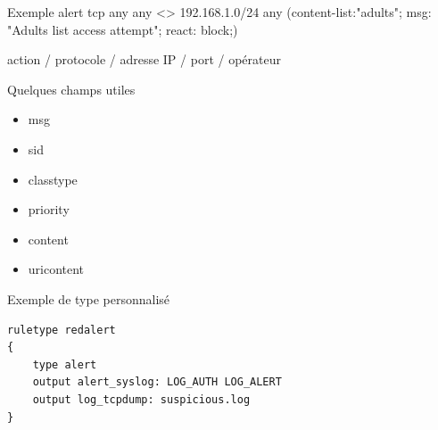 \documentclass{beamer}
\begin{document}
{\begin{exampleblock}{Exemple}
\color{red}alert \color{black!30!green}tcp \color{blue} any \color{blue!60!red}any \color{orange}<> \color{blue}192.168.1.0/24 \color{blue!60!red}any \color{black}(content-list:"adults"; msg: "Adults list access attempt"; react: block;)

\color{red}action	\color{black}/ \color{black!30!green}protocole \color{black}/ \color{blue}adresse IP \color{black}/ \color{blue!60!red}port \color{black}/ \color{orange}opérateur
\end{exampleblock}

\framebreak

\begin{block}{Quelques champs utiles}
\begin{itemize}
\item msg
\item sid
\item classtype
\item priority
\item content
\item uricontent
\end{itemize}
\end{block}

\framebreak

\begin{exampleblock}{Exemple de type personnalisé}
\begin{verbatim}
ruletype redalert
{
    type alert 
    output alert_syslog: LOG_AUTH LOG_ALERT 
    output log_tcpdump: suspicious.log
}
\end{verbatim}
\end{exampleblock}

}


\end{document}
